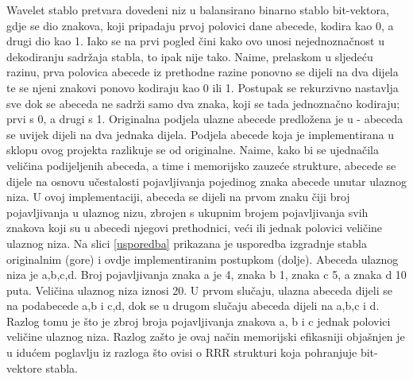Wavelet stablo pretvara dovedeni niz u balansirano binarno stablo bit-vektora, gdje se dio znakova, koji pripadaju prvoj polovici dane abecede, kodira kao 0, a drugi dio kao 1. Iako se na prvi pogled čini kako ovo unosi nejednoznačnost u dekodiranju sadržaja stabla, to ipak nije tako. Naime, prelaskom u sljedeću razinu, prva polovica abecede iz prethodne razine ponovno se dijeli na dva dijela te se njeni znakovi ponovo kodiraju kao 0 ili 1. Postupak se rekurzivno nastavlja sve dok se abeceda ne sadrži samo dva znaka, koji se tada jednoznačno kodiraju; prvi s 0, a drugi s 1. 
Originalna podjela ulazne abecede predložena je u \cite{wavelet} - abeceda se uvijek dijeli na dva jednaka dijela. Podjela abecede koja je implementirana u sklopu ovog projekta razlikuje se od originalne. Naime, kako bi se ujednačila veličina podijeljenih abeceda, a time i memorijsko zauzeće strukture, abecede se dijele na osnovu učestalosti pojavljivanja pojedinog znaka abecede unutar ulaznog niza. U ovoj implementaciji, abeceda se dijeli na prvom znaku čiji broj pojavljivanja u ulaznog nizu, zbrojen s ukupnim brojem pojavljivanja svih znakova koji su u abecedi njegovi prethodnici, veći ili jednak polovici veličine ulaznog niza.
Na slici \ref{usporedba} prikazana je usporedba izgradnje stabla originalnim (gore) i ovdje implementiranim postupkom (dolje). Abeceda ulaznog niza je {a,b,c,d}. Broj pojavljivanja znaka a je 4, znaka b 1, znaka c 5, a znaka d 10 puta. Veličina ulaznog niza iznosi 20. U prvom slučaju, ulazna abeceda dijeli se na podabecede {a,b} i {c,d}, dok se u drugom slučaju abeceda dijeli na {a,b,c} i {d}. Razlog tomu je što je zbroj broja pojavljivanja znakova a, b i c jednak polovici veličine ulaznog niza.
Razlog zašto je ovaj način memorijski efikasniji objašnjen je u idućem poglavlju iz razloga što ovisi o RRR strukturi koja pohranjuje bit-vektore stabla.

